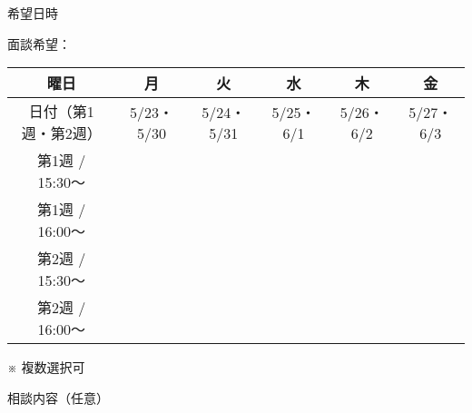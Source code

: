 \documentclass[paper=b5j, fleqn, jafontsize=9pt, jafontscale=1, head_space=25.5mm, foot_space=15mm, fore-edge=9.5mm, gutter=9.5mm, hanging_punctuation, baselineskip=7mm]{jlreq}
\begin{document}
\begin{answersheetb5}
\groupinfonoad


\begin{question}{希望日時}
\end{question}
\begin{answer}

\noindent 面談希望：
\begin{table}[H]
    \centering
        \begin{tabularx}{150mm}{|c|C|C|C|C|C|}\hline
            曜日     & 月         & 火         & 水        & 木        & 金        \\\hline
            日付（第1週・第2週）     & 5/23・5/30 & 5/24・5/31 & 5/25・6/1 & 5/26・6/2 & 5/27・6/3 \\\hline
            第1週 / 15:30〜 & \egg{~} & \egg{~} & \egg{~} & \egg{~} & \egg{~} \\\hline
            第1週 / 16:00〜 & \egg{~} & \egg{~} & \egg{~} & \egg{~} & \egg{~} \\\hline
            第2週 / 15:30〜 & \egg{~} & \egg{~} & \egg{~} & \egg{~} & \egg{~} \\\hline
            第2週 / 16:00〜 & \egg{~} & \egg{~} & \egg{~} & \egg{~} & \egg{~} \\\hline
        \end{tabularx}
\end{table}
\vspace{-4mm}
\begin{flushright}
※ 複数選択可
\end{flushright}
\end{answer}

\begin{question}{相談内容（任意）}

\end{question}
\begin{answer}
\writebox[height=30mm]{}

\end{answer}

\finalcheck

\end{answersheetb5}
\end{document}
